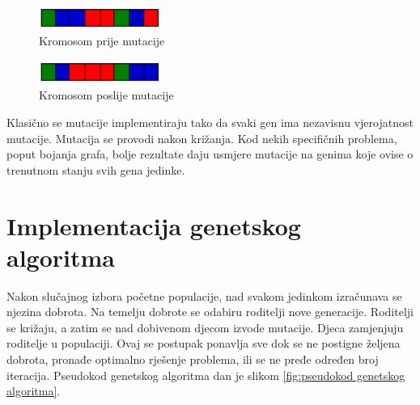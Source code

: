 \documentclass[times, utf8, zavrsni]{fer}
\begin{document}
\begin{figure}[htb]
\centering
\includegraphics[width=4cm]{images/prije_mutacije.png}
\caption{Kromosom prije mutacije}
\label{fig:kromosom prije mutacije}
\end{figure}

\begin{figure}[htb]
\centering
\includegraphics[width=4cm]{images/poslije_mutacije.png}
\caption{Kromosom poslije mutacije}
\label{fig:kromosom poslije mutacije}
\end{figure}

Klasično se mutacije implementiraju tako da svaki gen ima nezavisnu vjerojatnost mutacije. Mutacija se provodi nakon križanja. Kod nekih specifičnih problema, poput bojanja grafa, bolje rezultate daju usmjere mutacije na genima koje ovise o trenutnom stanju svih gena jedinke.

\section{Implementacija genetskog algoritma}
Nakon slučajnog izbora početne populacije, nad svakom jedinkom izračunava se njezina dobrota. Na temelju dobrote se odabiru roditelji nove generacije. Roditelji se križaju, a zatim se nad dobivenom djecom izvode mutacije. Djeca zamjenjuju roditelje u populaciji. Ovaj se postupak ponavlja sve dok se ne postigne željena dobrota, pronađe optimalno rješenje problema, ili se ne pređe određen broj iteracija. Pseudokod genetskog algoritma dan je slikom \ref{fig:pseudokod genetskog algoritma}.
\end{document}
